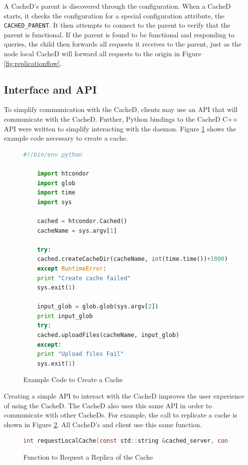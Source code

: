 A CacheD's parent is discovered through the configuration.  When a CacheD starts, it checks the configuration for a special configuration attribute, the \texttt{CACHED\_PARENT}.  It then attempts to connect to the parent to verify that the parent is functional.  If the parent is found to be functional and responding to queries, the child then forwards all requests it receives to the parent, just as the node local CacheD will forward all requests to the origin in Figure \ref{fig:replicationflow}.


\subsection{Interface and API}
To simplify communication with the CacheD, clients may use an API that will communicate with the CacheD.  Further, Python bindings to the CacheD C++ API were written to simplify interacting with the daemon.  Figure \ref{fig:createcacheexamplecode} shows the example code necessary to create a cache.

\begin{figure}[ht!]
	
	\begin{lstlisting}[language=Python]
	#!/bin/env python
	
	import htcondor
	import glob
	import time
	import sys
	
	cached = htcondor.Cached()
	cacheName = sys.argv[1]
	
	try:
	cached.createCacheDir(cacheName, int(time.time())+1000)
	except RuntimeError:
	print "Create cache failed"
	sys.exit(1)
	
	input_glob = glob.glob(sys.argv[2])
	print input_glob
	try:
	cached.uploadFiles(cacheName, input_glob)
	except:
	print "Upload files Fail"
	sys.exit(1)
	\end{lstlisting}
	\caption{Example Code to Create a Cache}
	\label{fig:createcacheexamplecode}
\end{figure}

Creating a simple API to interact with the CacheD improves the user experience of using the CacheD.  The CacheD also uses this same API in order to communicate with other CacheDs.  For example, the call to replicate a cache is shown in Figure \ref{fig:requestlocalcall}.  All CacheD's and client use this same function.

\begin{figure}[h!]
	\begin{lstlisting}[language=C,backgroundcolor=\color{grey},frame=none]
	int requestLocalCache(const std::string &cached_server, const std::string &cached_name, compat_classad::ClassAd& response, CondorError& err)
	\end{lstlisting}
	\caption{Function to Request a Replica of the Cache}
	\label{fig:requestlocalcall}
\end{figure}

